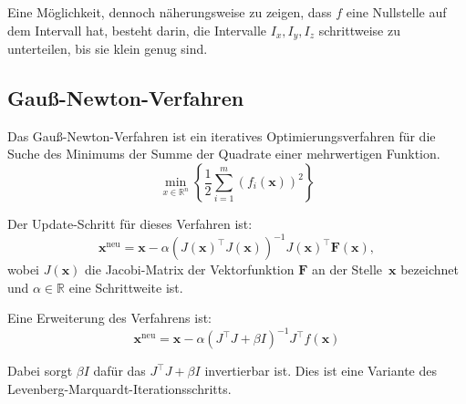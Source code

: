 \documentclass[
	ngerman,%
	accentcolor=9c,%
	ruledheaders=section,%
	class=report,%
	thesis={type=bachelor},%
	fontsize=11pt,%
	parskip=half-,%
	custommargins=true,%
	marginpar=false,%
]{tudapub}
\begin{document}
Eine Möglichkeit, dennoch näherungsweise zu zeigen, 
dass \( f \) eine Nullstelle auf dem Intervall hat, besteht darin, 
die Intervalle \( I_x, I_y, I_z \) schrittweise zu unterteilen, 
bis sie klein genug sind.

\subsection{Gauß-Newton-Verfahren}
Das Gauß-Newton-Verfahren ist ein iteratives Optimierungsverfahren für die Suche des Minimums der Summe der Quadrate einer mehrwertigen Funktion.
\[
\min _{x\in \mathbb {R} ^{n}}\left\{{\frac {1}{2}}\sum _{i=1}^{m}\left(f_{i}(\mathbf{x})\right)^{2}\right\}
\]

Der Update-Schritt für dieses Verfahren ist:
\[
\mathbf{x}^{\text{neu}} = \mathbf{x} - \alpha \left( J(\mathbf{x})^\top J(\mathbf{x}) \right)^{-1} J(\mathbf{x})^\top \mathbf{F}(\mathbf{x}),
\]
wobei $J(\mathbf{x})$ die Jacobi-Matrix der Vektorfunktion $\mathbf{F}$ an der Stelle~$\mathbf{x}$ bezeichnet und $\alpha \in \mathbb{R}$ eine Schrittweite ist.



Eine Erweiterung des Verfahrens ist:
\[\mathbf{x}^\text{neu} = \mathbf{x} - \alpha \left(J^\top J + \beta I\right)^{-1} J^\top f(\mathbf{x})\]

Dabei sorgt \(\beta I\) dafür das \(J^\top J+\beta I\) invertierbar ist.
Dies ist eine Variante des Levenberg-Marquardt-Iterationsschritts.
\end{document}
